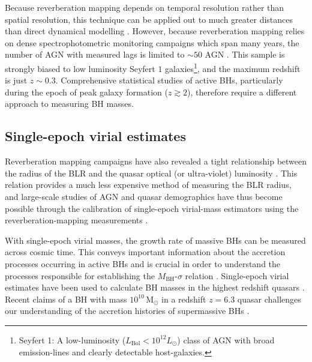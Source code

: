 Because reverberation mapping depends on temporal resolution rather than spatial resolution, this technique can be applied out to much greater distances than direct dynamical modelling \citep[e.g.][]{kormendy13}.
However, because reverberation mapping relies on dense spectrophotometric monitoring campaigns which span many years, the number of AGN with measured lags is limited to $\sim50$ AGN \citep[e.g.][]{kaspi00,peterson04,kaspi07,bentz09,denney10,barth11,grier12}. 
This sample is strongly biased to low luminosity Seyfert $1$ galaxies\footnote{Seyfert 1: A low-luminosity ($L_{\text{Bol}} < 10^{12}L_{\odot}$) class of AGN with broad emission-lines and clearly detectable host-galaxies.}, and the maximum redshift is just $z\sim0.3$. 
Comprehensive statistical studies of active BHs, particularly during the epoch of peak galaxy formation ($z\gtrsim2$), therefore require a different approach to measuring BH masses. 

\subsection{Single-epoch virial estimates}

Reverberation mapping campaigns have also revealed a tight relationship between the radius of the BLR and the quasar optical (or ultra-violet) luminosity \citep[the $R_{\text{BLR}}-L$ relation; e.g.][]{kaspi00,kaspi07}.
This relation provides a much less expensive method of measuring the BLR radius, and large-scale studies of AGN and quasar demographics \citep[e.g.][]{greene05b,vestergaard06,vestergaard09,shen11,shen12,trakhtenbrot12} have thus become possible through the calibration of single-epoch virial-mass estimators using the reverberation-mapping measurements \citep[e.g.][]{vestergaard02,mclure02,vestergaard06,mcgill08,wang09,rafiee11,park13}.

With single-epoch virial masses, the growth rate of massive BHs can be measured across cosmic time. 
This conveys important information about the accretion processes occurring in active BHs \citep[e.g.][]{kollmeier06} and is crucial in order to understand the processes responsible for establishing the $M_{\text{BH}}$-$\sigma$ relation \citep[e.g.][]{bennert11}.
Single-epoch virial estimates have been used to calculate BH masses in the highest redshift quasars \citep[e.g. a $10^9$\,M$_\odot$ BH in a redshift $z=7.1$ quasar;][]{mortlock11}. 
Recent claims of a BH with mass $10^{10}$\,M$_\odot$ in a redshift $z=6.3$ quasar \citep[when the Universe is less than $1$ Gyr old;][]{wu15} challenges our understanding of the accretion histories of supermassive BHs \citep[e.g.][]{willott03}. 

